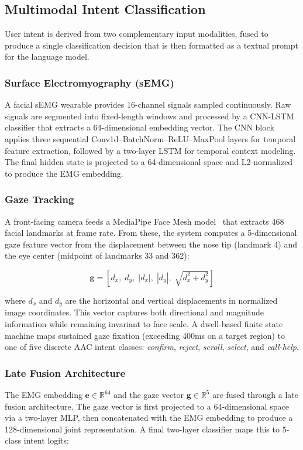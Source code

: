 \documentclass[journal]{IEEEtran}
\begin{document}
\subsection{Multimodal Intent Classification}
\label{sec:fusion}

User intent is derived from two complementary input modalities, fused to produce a single classification decision that is then formatted as a textual prompt for the language model.

\subsubsection{Surface Electromyography (sEMG)}
A facial sEMG wearable provides 16-channel signals sampled continuously. Raw signals are segmented into fixed-length windows and processed by a CNN-LSTM classifier that extracts a 64-dimensional embedding vector. The CNN block applies three sequential Conv1d--BatchNorm--ReLU--MaxPool layers for temporal feature extraction, followed by a two-layer LSTM for temporal context modeling. The final hidden state is projected to a 64-dimensional space and L2-normalized to produce the EMG embedding.

\subsubsection{Gaze Tracking}
A front-facing camera feeds a MediaPipe Face Mesh model~\cite{mediapipe} that extracts 468 facial landmarks at frame rate. From these, the system computes a 5-dimensional gaze feature vector from the displacement between the nose tip (landmark 4) and the eye center (midpoint of landmarks 33 and 362):

\begin{equation}
\mathbf{g} = [d_x,\; d_y,\; |d_x|,\; |d_y|,\; \sqrt{d_x^2 + d_y^2}]
\label{eq:gaze_vector}
\end{equation}

\noindent where $d_x$ and $d_y$ are the horizontal and vertical displacements in normalized image coordinates. This vector captures both directional and magnitude information while remaining invariant to face scale. A dwell-based finite state machine maps sustained gaze fixation (exceeding 400ms on a target region) to one of five discrete AAC intent classes: \emph{confirm}, \emph{reject}, \emph{scroll}, \emph{select}, and \emph{call-help}.

\subsubsection{Late Fusion Architecture}
The EMG embedding $\mathbf{e} \in \mathbb{R}^{64}$ and the gaze vector $\mathbf{g} \in \mathbb{R}^{5}$ are fused through a late fusion architecture. The gaze vector is first projected to a 64-dimensional space via a two-layer MLP, then concatenated with the EMG embedding to produce a 128-dimensional joint representation. A final two-layer classifier maps this to 5-class intent logits:
\end{document}
